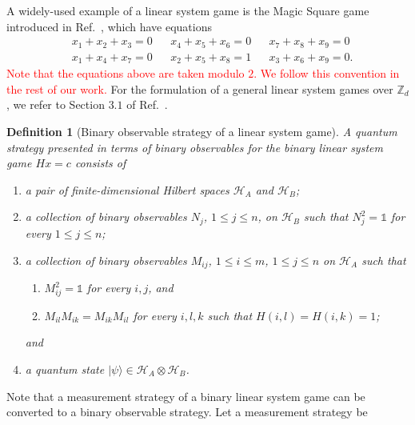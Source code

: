 \documentclass[11pt,letterpaper]{article}
\newcommand{\ket}[1]{|#1\rangle}
\newcommand{\x}{\otimes}
\newcommand{\Z}{\mathbb{Z}}
\newcommand{\calH}{\mathcal{H}}
\newcommand{\1}{\mathbb{1}}
\def\carl#1{{\color{blue} #1}}
\newcommand{\hf}[1]{\textcolor{red}{#1}}
\newtheorem{definition}[theorem]{Definition}
\theoremstyle{definition}
\begin{document}
A widely-used example of a linear system game is the Magic Square game introduced in Ref.~\cite{magic_square}, which 
have equations
\begin{align*}
    &x_1 + x_2 + x_3 = 0 && x_4 + x_5 + x_6 = 0 &&
    x_7 + x_8 + x_9 = 0 \\
    &x_1 + x_4 + x_7 = 0 && x_2 + x_5 + x_8 = 1 &&
    x_3 + x_6 + x_9 = 0.
\end{align*}
\hf{Note that the equations above are taken modulo $2$.
We follow this convention in the rest of our work.}
For the formulation of a general linear system games over $\Z_d$, we refer to Section $3.1$ of Ref.~\cite{coladan2017}.

\begin{definition}[Binary observable strategy of a linear system game]
\label{def:q_strat}
A quantum strategy presented in terms of binary observables for the binary linear system game $Hx = c$ consists of 
\begin{enumerate}
	\item a pair of finite-dimensional Hilbert spaces $\calH_A$ and $\calH_B$; 
	\item a collection of binary observables $N_j$, $1 \leq j \leq n$, on $\calH_B$
	such that $N_j^2 = \1$ for every $1 \leq j \leq n$; 
	\item a collection of binary observables $M_{ij}$, $1\leq i \leq m$, $1\leq j\leq n$ 
	on $\calH_A$ such that 
	\begin{enumerate}
		\item $M_{ij}^2 = \1$ for every $i,j$, and
		\item $M_{il}M_{ik} = M_{ik}M_{il}$ for every \carl{$i,l,k$ such that} $H(i,l) = H(i,k) =1$;
	\end{enumerate} 
	and
	\item a quantum state $\ket{\psi} \in \calH_A \x \calH_B$.
\end{enumerate}
\end{definition}
Note that a measurement strategy of a binary linear system game can be converted to a binary observable strategy. Let a measurement strategy be 
\end{document}
